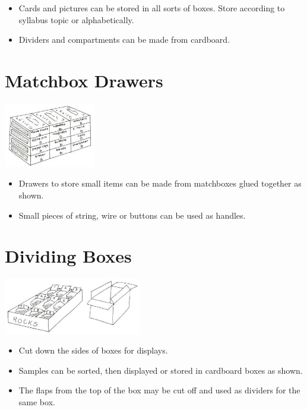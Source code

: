\begin{multicols}{2}
\begin{itemize}
\item Cards and pictures can be stored
in all sorts of boxes. Store
according to syllabus topic or
alphabetically.
\item Dividers and compartments can
be made from cardboard.
\end{itemize}


\section{Matchbox Drawers}

\begin{center}
\includegraphics[width=0.3\textwidth]{./img/vso/matchbox-drawer.jpg}
\end{center}

\begin{itemize}
\item Drawers to store small items can
be made from matchboxes
glued together as shown.
\item Small pieces of string, wire or
buttons can be used as handles.
\end{itemize}


\section{Dividing Boxes}

\begin{center}
\includegraphics[width=0.45\textwidth]{./img/vso/dividing-boxes.jpg}
\end{center}

\begin{itemize}
\item Cut down the sides of boxes for
displays.
\item Samples can be sorted, then
displayed or stored in cardboard
boxes as shown.
\item The flaps from the top of the
box may be cut off and used as dividers for the same box.
\end{itemize}



\end{multicols}
